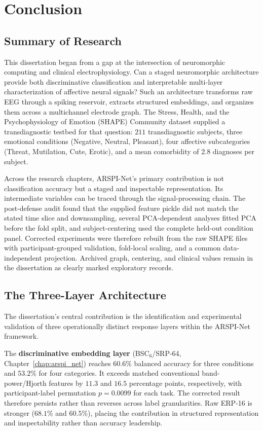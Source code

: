 \chapter{Conclusion}
\label{chap:conclusion}

\section{Summary of Research}

This dissertation began from a gap at the intersection of neuromorphic computing and clinical electrophysiology. Can a staged neuromorphic architecture provide both discriminative classification and interpretable multi-layer characterization of affective neural signals? Such an architecture transforms raw EEG through a spiking reservoir, extracts structured embeddings, and organizes them across a multichannel electrode graph. The Stress, Health, and the Psychophysiology of Emotion (SHAPE) Community dataset \cite{noauthor_shape_2018} supplied a transdiagnostic testbed for that question: $211$ transdiagnostic subjects, three emotional conditions (Negative, Neutral, Pleasant), four affective subcategories (Threat, Mutilation, Cute, Erotic), and a mean comorbidity of $2.8$ diagnoses per subject.

Across the research chapters, ARSPI-Net's primary contribution is not classification accuracy but a staged and inspectable representation. Its intermediate variables can be traced through the signal-processing chain. The post-defense audit found that the supplied feature pickle did not match the stated time slice and downsampling, several PCA-dependent analyses fitted PCA before the fold split, and subject-centering used the complete held-out condition panel. Corrected experiments were therefore rebuilt from the raw SHAPE files with participant-grouped validation, fold-local scaling, and a common data-independent projection. Archived graph, centering, and clinical values remain in the dissertation as clearly marked exploratory records.


\section{The Three-Layer Architecture}

The dissertation's central contribution is the identification and experimental validation of three operationally distinct response layers within the ARSPI-Net framework.

The \textbf{discriminative embedding layer} (BSC$_6$/SRP-64, Chapter~\ref{chap:arspi_net}) reaches $60.6\%$ balanced accuracy for three conditions and $53.2\%$ for four categories. It exceeds matched conventional band-power/Hjorth features by $11.3$ and $16.5$ percentage points, respectively, with participant-label permutation $p=0.0099$ for each task. The corrected result therefore persists rather than reverses across label granularities. Raw ERP-16 is stronger ($68.1\%$ and $60.5\%$), placing the contribution in structured representation and inspectability rather than accuracy leadership.

